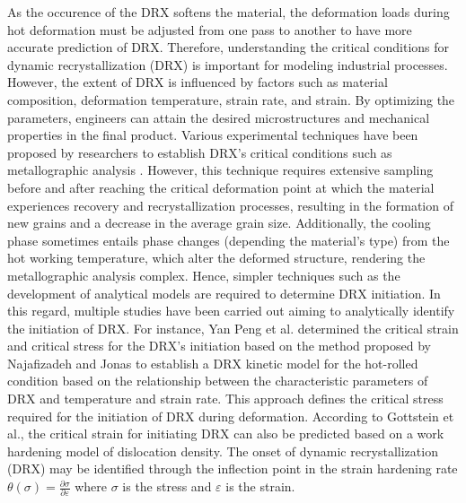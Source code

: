 \documentclass[metals,article,submit,pdftex,moreauthors]{Definitions/mdpi}
\makeatletter
\DeclareRobustCommand{\eal}{et al.\@\xspace}
\makeatother
\begin{document}
As the occurence of the DRX softens the material, the deformation loads during hot deformation must be adjusted from one pass to another to have more accurate prediction of DRX.
Therefore, understanding the critical conditions for dynamic recrystallization (DRX) is important for modeling industrial processes.
However, the extent of DRX is influenced by factors such as material composition, deformation temperature, strain rate, and strain.
By optimizing the parameters, engineers can attain the desired microstructures and mechanical properties in the final product.
Various experimental techniques have been proposed by researchers to establish DRX's critical conditions such as metallographic analysis \cite{babu2022implication, khan2021interactions}.
However, this technique requires extensive sampling before and after reaching the critical deformation point at which the material experiences recovery and recrystallization processes, resulting in the formation of new grains and a decrease in the average grain size.
Additionally, the cooling phase sometimes entails phase changes (depending the material's type) from the hot working temperature, which alter the deformed structure, rendering the metallographic analysis complex.
Hence, simpler techniques such as the development of analytical models are required to determine DRX initiation.
In this regard, multiple studies have been carried out aiming to analytically identify the initiation of DRX.
For instance, Yan Peng \eal \cite{peng2022dynamic} determined the critical strain and critical stress for the DRX's initiation based on the method proposed by Najafizadeh and Jonas \cite{Najafizadeh-2006} to establish a DRX kinetic model for the hot-rolled condition based on the relationship between the characteristic parameters of DRX and temperature and strain rate. This approach defines the critical stress required for the initiation of DRX during deformation.
According to Gottstein \eal \cite{gottstein2004prediction}, the critical strain for initiating DRX can also be predicted based on a work hardening model of dislocation density.
The onset of dynamic recrystallization (DRX) may be identified through the inflection point in the strain hardening rate $\theta(\sigma)=\frac{\partial \sigma}{\partial \varepsilon}$ where $\sigma$ is the stress and $\varepsilon$ is the strain.
\end{document}
